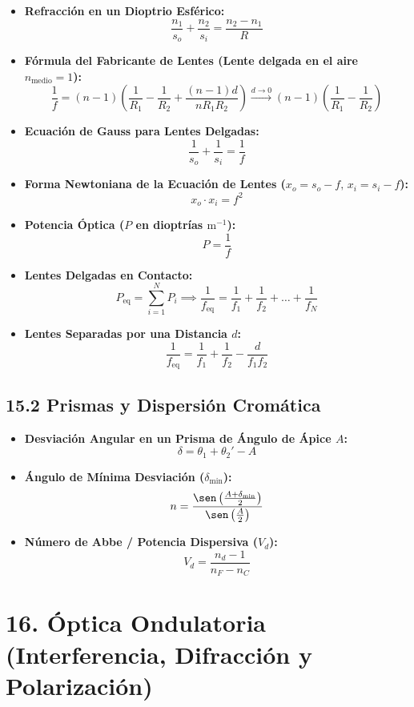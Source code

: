 \documentclass[11pt,a4paper]{article}
\begin{document}
\begin{itemize}
  \item \textbf{Refracción en un Dioptrio Esférico:}
  \[
    \frac{n_1}{s_o} + \frac{n_2}{s_i} = \frac{n_2 - n_1}{R}
  \]
  \item \textbf{Fórmula del Fabricante de Lentes (Lente delgada en el aire $n_{\text{medio}} = 1$):}
  \[
    \frac{1}{f} = (n - 1)\left( \frac{1}{R_1} - \frac{1}{R_2} + \frac{(n - 1)d}{n R_1 R_2} \right) \xrightarrow{d \to 0} (n - 1)\left( \frac{1}{R_1} - \frac{1}{R_2} \right)
  \]
  \item \textbf{Ecuación de Gauss para Lentes Delgadas:}
  \[
    \frac{1}{s_o} + \frac{1}{s_i} = \frac{1}{f}
  \]
  \item \textbf{Forma Newtoniana de la Ecuación de Lentes ($x_o = s_o - f, \, x_i = s_i - f$):}
  \[
    x_o \cdot x_i = f^2
  \]
  \item \textbf{Potencia Óptica ($P$ en dioptrías $\mathrm{m}^{-1}$):}
  \[
    P = \frac{1}{f}
  \]
  \item \textbf{Lentes Delgadas en Contacto:}
  \[
    P_{\mathrm{eq}} = \sum_{i=1}^N P_i \implies \frac{1}{f_{\mathrm{eq}}} = \frac{1}{f_1} + \frac{1}{f_2} + \dots + \frac{1}{f_N}
  \]
  \item \textbf{Lentes Separadas por una Distancia $d$:}
  \[
    \frac{1}{f_{\mathrm{eq}}} = \frac{1}{f_1} + \frac{1}{f_2} - \frac{d}{f_1 f_2}
  \]
\end{itemize}

\subsection*{15.2 Prismas y Dispersión Cromática}

\begin{itemize}
  \item \textbf{Desviación Angular en un Prisma de Ángulo de Ápice $A$:}
  \[
    \delta = \theta_1 + \theta_2' - A
  \]
  \item \textbf{Ángulo de Mínima Desviación ($\delta_{\min}$):}
  \[
    n = \frac{\sen\left( \frac{A + \delta_{\min}}{2} \right)}{\sen\left( \frac{A}{2} \right)}
  \]
  \item \textbf{Número de Abbe / Potencia Dispersiva ($V_d$):}
  \[
    V_d = \frac{n_d - 1}{n_F - n_C}
  \]
\end{itemize}

\section*{16. Óptica Ondulatoria (Interferencia, Difracción y Polarización)}
\end{document}
